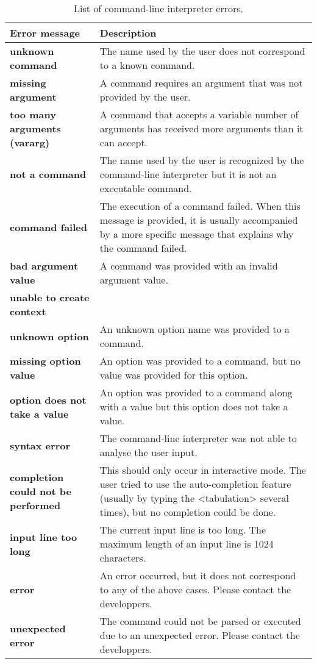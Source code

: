 \begin{table}
\begin{center}
\begin{tabular}{|l|p{8cm}|}
\hline
{\bf Error message} & {\bf Description}\\
\hline
\hline
{\bf unknown command} &
  The name used by the user does not correspond to a known command.\\
\hline
{\bf missing argument} &
  A command requires an argument that was not provided by the user.\\
\hline
{\bf too many arguments (vararg)} &
  A command that accepts a variable number of arguments has received
  more arguments than it can accept.\\
\hline
{\bf not a command} &
  The name used by the user is recognized by the command-line
  interpreter but it is not an executable command.\\
\hline
{\bf command failed} &
  The execution of a command failed. When this message is provided, it
  is usually accompanied by a more specific message that explains why
  the command failed.\\
\hline
{\bf bad argument value} &
  A command was provided with an invalid argument value.\\
\hline
{\bf unable to create context} &
  \\
\hline
{\bf unknown option} &
  An unknown option name was provided to a command.\\
\hline
{\bf missing option value} &
  An option was provided to a command, but no value was provided for
  this option.\\
\hline
{\bf option does not take a value} &
  An option was provided to a command along with a value but this
  option does not take a value.\\
\hline
{\bf syntax error} &
  The command-line interpreter was not able to analyse the user
  input.\\
\hline
{\bf completion could not be performed} &
  This should only occur in interactive mode. The user tried to use
  the auto-completion feature (usually by typing the <tabulation>
  several times), but no completion could be done.\\
\hline
{\bf input line too long} &
  The current input line is too long. The maximum length of an input
  line is 1024 characters.\\
\hline
{\bf error} &
  An error occurred, but it does not correspond to any of the above
  cases. Please contact the developpers.\\
\hline
{\bf unexpected error} &
  The command could not be parsed or executed due to an unexpected
  error. Please contact the developpers.\\
\hline
\end{tabular}
\caption{List of command-line interpreter errors.\label{tab:user-interface-errors}}
\end{center}
\end{table}

